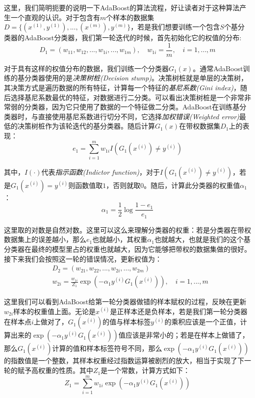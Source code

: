 \documentclass[UTF8, 12pt]{ctexart}
\begin{document}
这里，我们简明扼要的说明一下AdaBoost的算法流程，好让读者对于这种算法产生一个直观的认识。对于包含有$m$个样本的数据集$D=\{(x^{(1)}, y^{(1)}),...,(x^{(m)}), y^{(m)}\}$，若是我们想要训练一个包含$S$个基分类器的AdaBoost分类器，我们第一轮迭代的时候，首先初始化它的权值的分布:
\begin{equation}
	D_{1} = (w_{11}, w_{12},...,w_{1i},...,w_{1m}), \quad w_{1i} = \frac{1}{m}, \quad i = 1,...,m
\end{equation}

对于具有这样的权值分布的数据，我们训练一个分类器$G_{1}(x)$。通常AdaBoost训练的基分类器使用的是\emph{决策树桩(Decision stump)}。决策树桩就是单层的决策树，其决策方式是遍历数据的所有特征，计算每一个特征的\emph{基尼系数(Gini index)}，随后选择基尼系数最优的特征，对数据进行二分类。可以看出决策树桩是一个非常非常弱的分类器，因为它只使用了数据的一个特征做二分类。AdaBoost在训练基分类器时，与直接使用基尼系数进行切分不同，它选择\emph{加权错误(Weighted error)}最低的决策树桩作为该轮迭代的基分类器。随后计算$G_{1}(x)$在带权数据集$D_{1}$上的表现：
\begin{equation}
	e_{1} = \sum_{i=1}^{m} {w_{1i}I(G_{1}(x^{(i)}) \neq y^{(i)})}
\end{equation}

其中，$I(·)$代表\emph{指示函数(Indictor function)}，对于$I(G_{1}(x^{(i)}) \neq y^{(i)})$，若是$G_{1}(x^{(i)}) = y^{(i)}$则函数值取$1$，否则就取$0$。随后，计算此分类器的权重值$\alpha_{1}$：
\begin{equation}
	\alpha_{1} = \frac{1}{2} \log\frac{1-e_{1}}{e_{1}}
\end{equation}

这里取的对数是自然对数。这里可以这么来理解分类器的权重：若是分类器在带权数据集上的误差越小，那么$e_{1}$也就越小，其权重$\alpha_{1}$也就越大，也就是我们的这个基分类器在最终的模型里占的权重也就越大，因为它能够把带权的数据集做的很好。接下来我们会按照这一轮的错误情况，更新权值为：
\begin{align}
	& D_{2} = (w_{21}, w_{22},...,w_{2i},...,w_{2m}) \\
	& w_{2i} = \frac{w_{1i}}{Z_{1}} \exp{(-\alpha_{1}y^{(i)}G_{1}(x^{(i)}))}, \quad i = 1,..., m
\end{align}

这里我们可以看到AdaBoost给第一轮分类器做错的样本赋权的过程，反映在更新$w_{2i}$样本的权重值上面。无论是$x^{(i)}$是正样本还是负样本，若是我们第一轮分类器在样本点$i$上做对了，$G_{1}(x^{(i)})$的值与样本标签$y^{(i)}$的乘积应该是一个正值，计算出来的$\exp(-\alpha_{1}y^{(i)}G_{1}(x^{(i)}))$值应该是非常小的；若是在样本上做错了，那么$G_{1}(x^{(i)})$计算的值和样本标签符号不同，那么$\exp(-\alpha_{1}y^{(i)}G_{1}(x^{(i)}))$的指数值是一个整数，其样本权重经过指数运算被剧烈的放大，相当于实现了下一轮的赋予高权重的性质。其中$Z_{1}$是一个常数，计算方式如下：
\begin{equation}
	Z_{1} = \sum_{i=1}^{m} w_{1i}\exp{(-\alpha_{1}y^{(i)}G_{1}(x^{(i)}))}
\end{equation}
\end{document}
